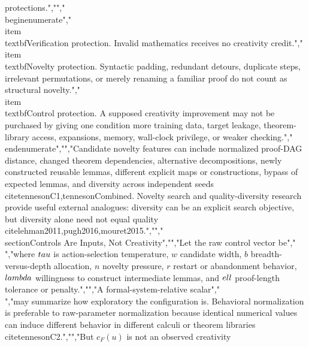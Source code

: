 {{{protections.","","\\begin{enumerate}","\\item \\textbf{Verification protection.} Invalid mathematics receives no creativity credit.","\\item \\textbf{Novelty protection.} Syntactic padding, redundant detours, duplicate steps, irrelevant permutations, or merely renaming a familiar proof do not count as structural novelty.","\\item \\textbf{Control protection.} A supposed creativity improvement may not be purchased by giving one condition more training data, target leakage, theorem-library access, expansions, memory, wall-clock privilege, or weaker checking.","\\end{enumerate}","","Candidate novelty features can include normalized proof-DAG distance, changed theorem dependencies, alternative decompositions, newly constructed reusable lemmas, different explicit maps or constructions, bypass of expected lemmas, and diversity across independent seeds \\cite{tennesonC1,tennesonCombined}. Novelty search and quality-diversity research provide useful external analogues: diversity can be an explicit search objective, but diversity alone need not equal quality \\cite{lehman2011,pugh2016,mouret2015}.","","\\section{Controls Are Inputs, Not Creativity}","","Let the raw control vector be","\\[","u=(\\tau,w,b,n,r,\\lambda,\\ell),","\\]","where $\\tau$ is action-selection temperature, $w$ candidate width, $b$ breadth-versus-depth allocation, $n$ novelty pressure, $r$ restart or abandonment behavior, $\\lambda$ willingness to construct intermediate lemmas, and $\\ell$ proof-length tolerance or penalty.","","A formal-system-relative scalar","\\[","c_F(u)=\\sum_i \\alpha_{i,F}z_{i,F}(u_i),","\\qquad","\\alpha_{i,F}\\ge 0,","\\qquad","\\sum_i\\alpha_{i,F}=1,","\\]","may summarize how exploratory the configuration is. Behavioral normalization is preferable to raw-parameter normalization because identical numerical values can induce different behavior in different calculi or theorem libraries \\cite{tennesonC2}.","","But $c_F(u)$ is not an observed creativity }}}
